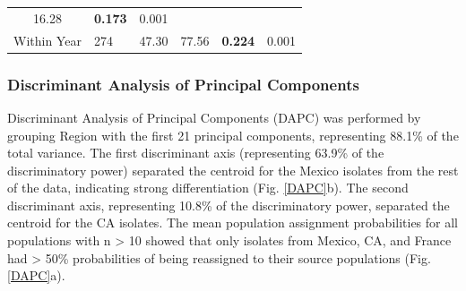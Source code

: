 \documentclass[fleqn,10pt,lineno]{wlpeerj} %
\theoremstyle{definition}
\theoremstyle{definition}
\theoremstyle{definition}
\theoremstyle{remark}
\begin{document}
\begin{longtable}[]{@{}clrllc@{}}
\begin{minipage}[t]{0.13\columnwidth}
16.28\strut
\end{minipage} & \begin{minipage}[t]{0.19\columnwidth}\raggedright\strut
\textbf{0.173}\strut
\end{minipage} & \begin{minipage}[t]{0.07\columnwidth}\centering\strut
0.001\strut
\end{minipage}\tabularnewline
\begin{minipage}[t]{0.32\columnwidth}\centering\strut
Within Year\strut
\end{minipage} & \begin{minipage}[t]{0.06\columnwidth}\raggedright\strut
274\strut
\end{minipage} & \begin{minipage}[t]{0.07\columnwidth}\raggedleft\strut
47.30\strut
\end{minipage} & \begin{minipage}[t]{0.13\columnwidth}\raggedright\strut
77.56\strut
\end{minipage} & \begin{minipage}[t]{0.19\columnwidth}\raggedright\strut
\textbf{0.224}\strut
\end{minipage} & \begin{minipage}[t]{0.07\columnwidth}\centering\strut
0.001\strut
\end{minipage}\tabularnewline
\bottomrule
\end{longtable}

\newpage

\subsubsection*{Discriminant Analysis of Principal
Components}\label{discriminant-analysis-of-principal-components}

Discriminant Analysis of Principal Components (DAPC) was performed by
grouping Region with the first 21 principal components, representing
88.1\% of the total variance. The first discriminant axis (representing
63.9\% of the discriminatory power) separated the centroid for the
Mexico isolates from the rest of the data, indicating strong
differentiation (Fig. \ref{DAPC}b). The second discriminant axis,
representing 10.8\% of the discriminatory power, separated the centroid
for the CA isolates. The mean population assignment probabilities for
all populations with n \textgreater{} 10 showed that only isolates from
Mexico, CA, and France had \textgreater{} 50\% probabilities of being
reassigned to their source populations (Fig. \ref{DAPC}a).
\end{document}
